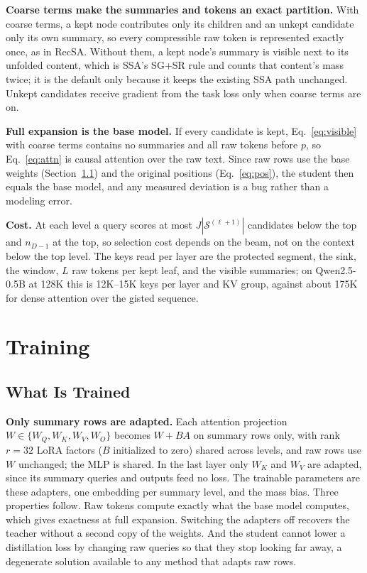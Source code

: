\documentclass[10pt,twocolumn]{article}
\newcommand{\para}[1]{\noindent\textbf{#1}\hspace{0.5em}}
\begin{document}
\para{Coarse terms make the summaries and tokens an exact partition.}
With coarse terms, a kept node contributes only its children and an unkept candidate only its
own summary, so every compressible raw token is represented exactly once, as in RecSA. Without
them, a kept node's summary is visible next to its unfolded content, which is SSA's SG+SR rule
and counts that content's mass twice; it is the default only because it keeps the existing
SSA path unchanged. Unkept candidates receive gradient from the task loss only when coarse
terms are on.

\para{Full expansion is the base model.}
If every candidate is kept, Eq.~\eqref{eq:visible} with coarse terms contains no summaries and
all raw tokens before $p$, so Eq.~\eqref{eq:attn} is causal attention over the raw text. Since
raw rows use the base weights (Section~\ref{sec:params}) and the original positions
(Eq.~\eqref{eq:pos}), the student then equals the base model, and any measured deviation is a
bug rather than a modeling error.

\para{Cost.}
At each level a query scores at most $J|\mathcal{S}^{(\ell+1)}|$ candidates below the top and
$n_{D-1}$ at the top, so selection cost depends on the beam, not on the context below the top
level. The keys read per layer are the protected segment, the sink, the window, $L$ raw tokens
per kept leaf, and the visible summaries; on Qwen2.5-0.5B at 128K this is 12K--15K keys per
layer and KV group, against about 175K for dense attention over the gisted sequence.

\section{Training}
\label{sec:training}

\subsection{What Is Trained}
\label{sec:params}

\para{Only summary rows are adapted.}
Each attention projection $W\in\{W_Q,W_K,W_V,W_O\}$ becomes $W+BA$ on summary rows only, with
rank $r=32$ LoRA \citep{hu2022lora} factors ($B$ initialized to zero) shared across levels,
and raw rows use $W$ unchanged; the MLP is shared. In the last layer only $W_K$ and $W_V$ are
adapted, since its summary queries and outputs feed no loss. The trainable parameters are
these adapters, one embedding per summary level, and the mass bias. Three properties follow.
Raw tokens compute exactly what the base model computes, which gives exactness at full
expansion. Switching the adapters off recovers the teacher without a second copy of the
weights. And the student cannot lower a distillation loss by changing raw queries so that they
stop looking far away, a degenerate solution available to any method that adapts raw rows.
\end{document}
